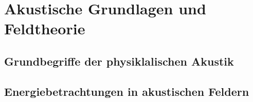 %
%
%
%
\section{Akustische Grundlagen und Feldtheorie
\label{helmholtz:section:akustische_Grundlagen}}


\subsection{Grundbegriffe der physiklalischen Akustik
\label{helmholtz:subsection:Grundbegriffe_Akustik}}

\subsection{Energiebetrachtungen in akustischen Feldern
\label{helmholtz:subsection:Energiebetrachtung}}



